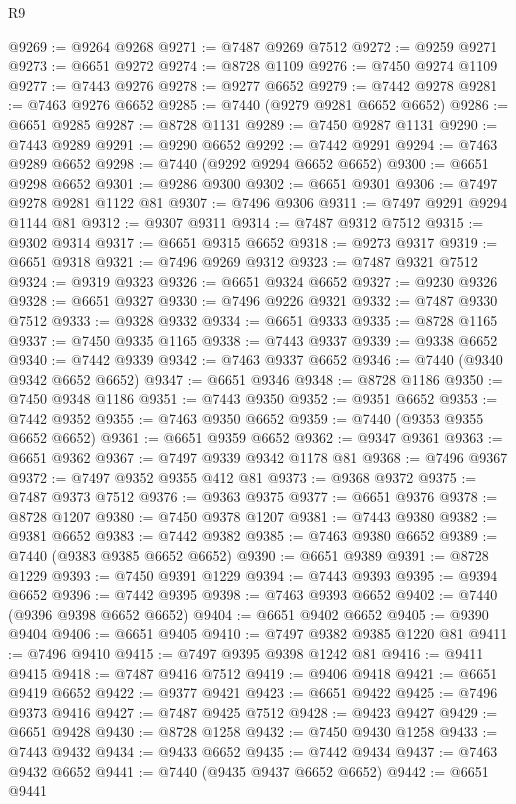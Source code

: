 \begin{lexlean}{R9}
\begin{coremodule}
@9269 := @9264 @9268
@9271 := @7487 @9269 @7512
@9272 := @9259 @9271
@9273 := @6651 @9272
@9274 := @8728 @1109
@9276 := @7450 @9274 @1109
@9277 := @7443 @9276
@9278 := @9277 @6652
@9279 := @7442 @9278
@9281 := @7463 @9276 @6652
@9285 := @7440 (@9279 @9281 @6652 @6652)
@9286 := @6651 @9285
@9287 := @8728 @1131
@9289 := @7450 @9287 @1131
@9290 := @7443 @9289
@9291 := @9290 @6652
@9292 := @7442 @9291
@9294 := @7463 @9289 @6652
@9298 := @7440 (@9292 @9294 @6652 @6652)
@9300 := @6651 @9298 @6652
@9301 := @9286 @9300
@9302 := @6651 @9301
@9306 := @7497 @9278 @9281 @1122 @81
@9307 := @7496 @9306
@9311 := @7497 @9291 @9294 @1144 @81
@9312 := @9307 @9311
@9314 := @7487 @9312 @7512
@9315 := @9302 @9314
@9317 := @6651 @9315 @6652
@9318 := @9273 @9317
@9319 := @6651 @9318
@9321 := @7496 @9269 @9312
@9323 := @7487 @9321 @7512
@9324 := @9319 @9323
@9326 := @6651 @9324 @6652
@9327 := @9230 @9326
@9328 := @6651 @9327
@9330 := @7496 @9226 @9321
@9332 := @7487 @9330 @7512
@9333 := @9328 @9332
@9334 := @6651 @9333
@9335 := @8728 @1165
@9337 := @7450 @9335 @1165
@9338 := @7443 @9337
@9339 := @9338 @6652
@9340 := @7442 @9339
@9342 := @7463 @9337 @6652
@9346 := @7440 (@9340 @9342 @6652 @6652)
@9347 := @6651 @9346
@9348 := @8728 @1186
@9350 := @7450 @9348 @1186
@9351 := @7443 @9350
@9352 := @9351 @6652
@9353 := @7442 @9352
@9355 := @7463 @9350 @6652
@9359 := @7440 (@9353 @9355 @6652 @6652)
@9361 := @6651 @9359 @6652
@9362 := @9347 @9361
@9363 := @6651 @9362
@9367 := @7497 @9339 @9342 @1178 @81
@9368 := @7496 @9367
@9372 := @7497 @9352 @9355 @412 @81
@9373 := @9368 @9372
@9375 := @7487 @9373 @7512
@9376 := @9363 @9375
@9377 := @6651 @9376
@9378 := @8728 @1207
@9380 := @7450 @9378 @1207
@9381 := @7443 @9380
@9382 := @9381 @6652
@9383 := @7442 @9382
@9385 := @7463 @9380 @6652
@9389 := @7440 (@9383 @9385 @6652 @6652)
@9390 := @6651 @9389
@9391 := @8728 @1229
@9393 := @7450 @9391 @1229
@9394 := @7443 @9393
@9395 := @9394 @6652
@9396 := @7442 @9395
@9398 := @7463 @9393 @6652
@9402 := @7440 (@9396 @9398 @6652 @6652)
@9404 := @6651 @9402 @6652
@9405 := @9390 @9404
@9406 := @6651 @9405
@9410 := @7497 @9382 @9385 @1220 @81
@9411 := @7496 @9410
@9415 := @7497 @9395 @9398 @1242 @81
@9416 := @9411 @9415
@9418 := @7487 @9416 @7512
@9419 := @9406 @9418
@9421 := @6651 @9419 @6652
@9422 := @9377 @9421
@9423 := @6651 @9422
@9425 := @7496 @9373 @9416
@9427 := @7487 @9425 @7512
@9428 := @9423 @9427
@9429 := @6651 @9428
@9430 := @8728 @1258
@9432 := @7450 @9430 @1258
@9433 := @7443 @9432
@9434 := @9433 @6652
@9435 := @7442 @9434
@9437 := @7463 @9432 @6652
@9441 := @7440 (@9435 @9437 @6652 @6652)
@9442 := @6651 @9441

\end{coremodule}
\end{lexlean}
